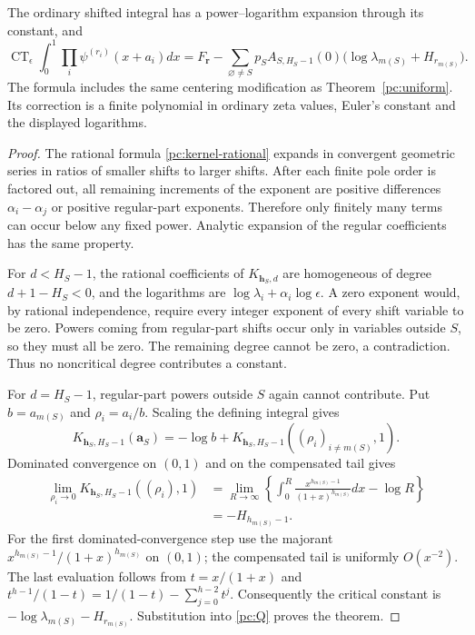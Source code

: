 \begin{theorem}\label{pc:nonresonant}
The ordinary shifted integral has a power--logarithm expansion through
its constant, and
\begin{equation}\label{pc:nonresonant-constant}
 \boxed{\displaystyle
 \operatorname{CT}_{\epsilon}
      \int_0^1\prod_i\psi^{(r_i)}(x+a_i)dx
  =F_{\boldsymbol r}
    -\sum_{\varnothing\ne S}p_S A_{S,H_S-1}(0)
            \bigl(\log\lambda_{m(S)}+H_{r_{m(S)}}\bigr).}
\end{equation}
The formula includes the same centering modification as
Theorem~\ref{pc:uniform}.  Its correction is a finite polynomial in
ordinary zeta values, Euler's constant and the displayed logarithms.
\end{theorem}

\begin{proof}
The rational formula \eqref{pc:kernel-rational} expands in convergent
geometric series in ratios of smaller shifts to larger shifts.
After each finite pole order is factored out, all remaining increments
of the exponent are positive differences $\alpha_i-\alpha_j$ or
positive regular-part exponents.  Therefore only finitely many terms
can occur below any fixed power.  Analytic expansion of the regular
coefficients has the same property.

For $d<H_S-1$, the rational coefficients of $K_{\boldsymbol h_S,d}$
are homogeneous of degree $d+1-H_S<0$, and the logarithms are
$\log\lambda_i+\alpha_i\log\epsilon$.  A zero exponent would,
by rational independence, require every integer exponent of every
shift variable to be zero.  Powers coming from regular-part shifts
occur only in variables outside $S$, so they must all be zero.
The remaining degree cannot be zero, a contradiction.  Thus no
noncritical degree contributes a constant.

For $d=H_S-1$, regular-part powers outside $S$ again cannot contribute.
Put $b=a_{m(S)}$ and $\rho_i=a_i/b$.  Scaling the defining integral
gives
\[
 K_{\boldsymbol h_S,H_S-1}(\boldsymbol a_S)
     =-\log b+
          K_{\boldsymbol h_S,H_S-1}
                         ((\rho_i)_{i\ne m(S)},1).
\]
Dominated convergence on $(0,1)$ and on the compensated tail gives
\begin{align*}
 \lim_{\rho_i\to0}
 K_{\boldsymbol h_S,H_S-1}((\rho_i),1)
 &=\lim_{R\to\infty}\left\{
   \int_0^R\frac{x^{h_{m(S)}-1}}{(1+x)^{h_{m(S)}}}dx-\log R
                                        \right\}\\
 &=-H_{h_{m(S)}-1}.
\end{align*}
For the first dominated-convergence step use the majorant
$x^{h_{m(S)}-1}/(1+x)^{h_{m(S)}}$ on $(0,1)$; the compensated
tail is uniformly $O(x^{-2})$.  The last evaluation follows from
$t=x/(1+x)$ and
$t^{h-1}/(1-t)=1/(1-t)-\sum_{j=0}^{h-2}t^j$.
Consequently the critical constant is
$-\log\lambda_{m(S)}-H_{r_{m(S)}}$.  Substitution into
\eqref{pc:Q} proves the theorem.
\end{proof}

